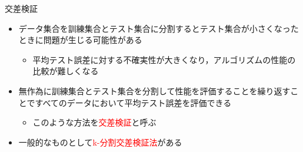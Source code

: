 \documentclass[dvipdfmx, 10pt]{beamer}
\begin{document}

\begin{frame}{交差検証}
  \begin{itemize}
    \item データ集合を訓練集合とテスト集合に分割するとテスト集合が小さくなったときに問題が生じる可能性がある
    \begin{itemize}
      \item 平均テスト誤差に対する不確実性が大きくなり，アルゴリズムの性能の比較が難しくなる
    \end{itemize}
    \item 無作為に訓練集合とテスト集合を分割して性能を評価することを繰り返すことですべてのデータにおいて平均テスト誤差を評価できる
    \begin{itemize}
      \item このような方法を\textcolor{red}{交差検証}と呼ぶ
    \end{itemize}
  \item 一般的なものとして\textcolor{red}{k-分割交差検証法}がある
  \end{itemize}
\end{frame}

\end{document}
